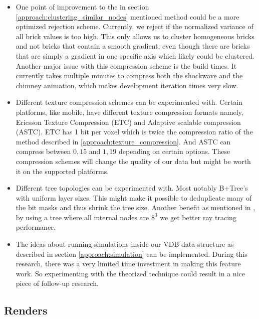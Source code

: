 \begin{itemize}
    \item One point of improvement to the in section \ref{approach:clustering_similar_nodes} mentioned method could be a more optimized rejection scheme. Currently, we reject if the normalized variance of all brick values is too high. This only allows us to cluster homogeneous bricks and not bricks that contain a smooth gradient, even though there are bricks that are simply a gradient in one specific axis which likely could be clustered. Another major issue with this compression scheme is the build times. It currently takes multiple minutes to compress both the shockwave and the chimney animation, which makes development iteration times very slow.
    \item Different texture compression schemes can be experimented with. Certain platforms, like mobile, have different texture compression formats namely, Ericsson Texture Compression (ETC) and Adaptive scalable compression (ASTC). ETC has 1 bit per voxel which is twice the compression ratio of the method described in \ref{approach:texture_compression}. And ASTC can compress between $0,15$ and $1,19$ depending on certain options. These compression schemes will change the quality of our data but might be worth it on the supported platforms.
    \item Different tree topologies can be experimented with. Most notably B+Tree's with uniform layer sizes. This might make it possible to deduplicate many of the bit masks and thus shrink the tree size. Another benefit as mentioned in \cite{hoetzlein2016gvdb}, by using a tree where all internal nodes are $8^3$ we get better ray tracing performance.
    \item The ideas about running simulations inside our VDB data structure as described in section \ref{approach:simulation} can be implemented. During this research, there was a very limited time investment in making this feature work. So experimenting with the theorized technique could result in a nice piece of follow-up research.
\end{itemize}

\subsection{Renders}

